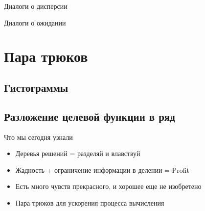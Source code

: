\documentclass[14pt, fleqn, xcolor={dvipsnames, table}]{beamer}
\begin{document}
\begin{frame}{Диалоги о дисперсии}
\end{frame}
\begin{frame}{Диалоги о ожидании} %
\end{frame}


\section{Пара трюков}
\subsection{Гистограммы}
\subsection{Разложение целевой функции в ряд}

\begin{frame}{Что мы сегодня узнали}
\begin{itemize}
  \item Деревья решений = разделяй и влавствуй
  \item Жадность + ограничение информации в делении = Profit
  \item Есть много чувств прекрасного, и хорошее еще не изобретено
  \item Пара трюков для ускорения процесса вычисления
\end{itemize}
\end{frame}
\end{document}
